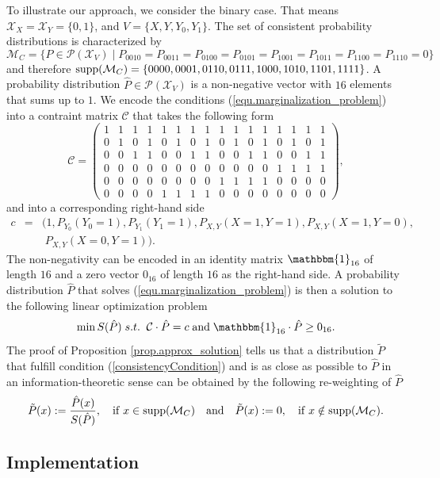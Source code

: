 \documentclass[letterpaper]{article}
\newcommand{\kC}{\mathcal{C}}   %
\newcommand{\kM}{\mathcal{M}}   %
\newcommand{\kP}{\mathcal{P}}   %
\newcommand{\kX}{\mathcal{X}}   %
\newcommand{\Ind}{\mathbbm{1}} %
\newcommand{\supp}{{\rm supp}}
\begin{document}
To illustrate our approach, we consider the binary case. That means $\kX_X = \kX_Y = \{0,1\}$, and $V=\{X,Y,Y_0, Y_1\}$. The set of consistent probability distributions is characterized by $$
\kM_C=\{P \in \kP(\kX_V) \;|\; P_{0010} = P_{0011} = P_{0100} = P_{0101} = P_{1001} = P_{1011} = P_{1100} = P_{1110} = 0\}
$$ 
and therefore $\supp(\kM_C) = \{0000, 0001, 0110, 0111, 1000, 1010, 1101, 1111 \}$. A probability distribution $\hat P \in \kP(\kX_V)$ is a non-negative vector with $16$ elements that sums up to $1$. We encode the conditions (\ref{equ.marginalization_problem}) into a contraint matrix $\kC$ that takes the following form
$$\kC =
\begin{pmatrix}
1 & 1 & 1 & 1 & 1 & 1 & 1 & 1 & 1 & 1 & 1 & 1 & 1 & 1 & 1 & 1 \\
0 & 1 & 0 & 1 & 0 & 1 & 0 & 1 & 0 & 1 & 0 & 1 & 0 & 1 & 0 & 1 \\
0 & 0 & 1 & 1 & 0 & 0 & 1 & 1 & 0 & 0 & 1 & 1 & 0 & 0 & 1 & 1 \\
0 & 0 & 0 & 0 & 0 & 0 & 0 & 0 & 0 & 0 & 0 & 0 & 1 & 1 & 1 & 1 \\
0 & 0 & 0 & 0 & 0 & 0 & 0 & 0 & 1 & 1 & 1 & 1 & 0 & 0 & 0 & 0 \\
0 & 0 & 0 & 0 & 1 & 1 & 1 & 1 & 0 & 0 & 0 & 0 & 0 & 0 & 0 & 0 
\end{pmatrix},
$$
and into a corresponding right-hand side 
\begin{eqnarray*}
c & = &(1, P_{Y_0}(Y_0 = 1), P_{Y_1}(Y_1 = 1), P_{X,Y}(X = 1, Y=1), P_{X,Y}(X = 1, Y=0), \\
& &\; P_{X,Y}(X = 0, Y=1)).
\end{eqnarray*}
The non-negativity can be encoded in an identity matrix $\Ind_{16}$ of length $16$ and a zero vector $0_{16}$ of length $16$ as the right-hand side. A probability distribution $\hat P$ that solves (\ref{equ.marginalization_problem}) is then a solution to the following linear optimization problem
$$
\min S(\hat P) \; s.t. \; \; \kC \cdot \hat P = c \; {\rm and}\; \Ind_{16} \cdot \hat P \ge 0_{16}.
$$
The proof of Proposition \ref{prop.approx_solution} tells us that a distribution $\tilde P$ that fulfill condition (\ref{consistencyCondition}) and is as close as possible to $\hat P$ in an information-theoretic sense can be obtained by the following re-weighting of $\hat P$
$$
\tilde P (x) := \frac{\hat P(x)}{S(\hat P)}, \quad {\rm if}\; x \in \supp(\kM_C) \quad {\rm and}\quad \tilde P(x) := 0, \quad {\rm if}\; x \notin \supp(\kM_C).
$$

\subsection{Implementation}
\end{document}
